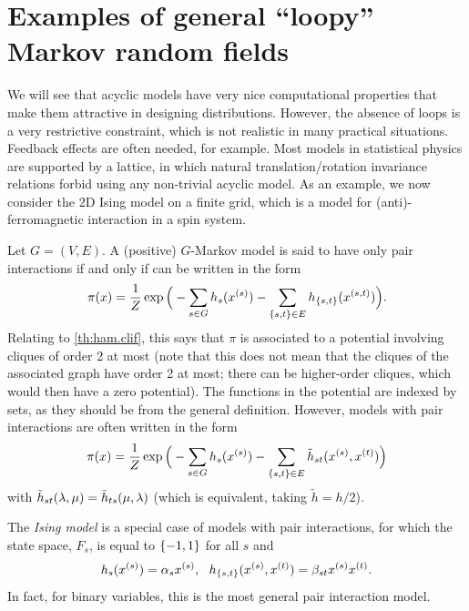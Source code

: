 \section{Examples of general ``loopy'' Markov random fields}

We will see that acyclic models have very nice computational
properties that make them attractive in designing
distributions. However, the absence of loops is a very restrictive
constraint, which is not realistic in many practical situations.
Feedback effects are often needed, for example. Most models in statistical physics are
supported by a lattice, in which natural translation/rotation
invariance relations forbid using any non-trivial acyclic model. As an
example, we now consider the 2D Ising model on a finite grid, which is a
model for (anti)-ferromagnetic interaction in a spin system.

Let $G = (V,E)$. A (positive) $G$-Markov model is said to have only pair interactions if and only if can be written in the form
$$
\pi(x) = \frac{1}{Z} \exp\Big(-\sum_{s\in G} h_s(x^{(s)}) -
\sum_{\left\{ s,t \right\}\in E} h_{\left\{ s,t \right\}}(x^{(s,t)})\Big).
$$
Relating to  \cref{th:ham.clif}, this says that $\pi$ is
associated to a potential involving cliques of order 2 at
most (note that this does not mean that the cliques of the associated
graph have order 2 at most; there can be higher-order cliques,
which would then have a
zero potential). The functions in the potential are indexed
by sets, as they should be from the general definition. However, models with pair interactions are often written in the form
$$
\pi(x) = \frac{1}{Z} \exp\Big(-\sum_{s\in G} h_s(x^{(s)}) -
\sum_{\left\{ s,t \right\}\in E} \tilde h_{st}(x^{(s)}, x^{(t)})\Big)
$$
with $\tilde h_{st}(\lambda,\mu) = \tilde h_{ts}(\mu, \lambda)$ (which is
equivalent, taking $\tilde h = h/2$). 

The {\em Ising model} is a special case of models with pair interactions, for
which the state space, $F_s$, is equal to $\left\{ -1,1 \right\}$ for all $s$
and 
$$
h_s(\pe xs) = \al_s \pe xs,\ \   h_{\{s,t\}}(\pe xs, \pe xt) = \be_{st} \pe xs \pe xt.
$$
In fact, for binary variables, this is the most general pair
interaction model. 

